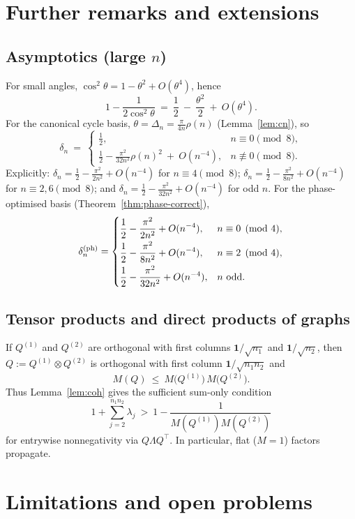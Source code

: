 \documentclass[12pt,fleqn]{amsart}
\renewcommand{\le}{\leqslant}
\theoremstyle{remark}
\newcommand{\1}{\mathbf{1}}
\newcommand{\Lam}{\Lambda}
\begin{document}
\section{Further remarks and extensions}

\subsection*{Asymptotics (large \texorpdfstring{$n$}{n})}
For small angles, $\cos^2\theta=1-\theta^2+O(\theta^4)$, hence
\[
1-\frac{1}{2\cos^2\theta}\ =\ \frac12\ -\ \frac{\theta^2}{2}\ +\ O(\theta^4).
\]
For the canonical cycle basis, $\theta=\Delta_n=\frac{\pi}{4n}\rho(n)$ (Lemma~\ref{lem:cn}), so
\[
\delta_n\ =\
\begin{cases}
\displaystyle \frac12, & n\equiv 0\pmod{8},\\[1mm]
\displaystyle \frac12 - \frac{\pi^2}{32n^2}\rho(n)^2\ +\ O(n^{-4}), & n\not\equiv 0\pmod{8}.
\end{cases}
\]
Explicitly: $\delta_n=\frac12-\frac{\pi^2}{2n^2}+O(n^{-4})$ for $n\equiv 4\pmod{8}$; $\delta_n=\frac12-\frac{\pi^2}{8n^2}+O(n^{-4})$ for $n\equiv 2,6\pmod{8}$; and $\delta_n=\frac12-\frac{\pi^2}{32n^2}+O(n^{-4})$ for odd $n$. For the phase-optimised basis (Theorem~\ref{thm:phase-correct}),
\[
\delta_n^{\rm (ph)}=
\begin{cases}
\displaystyle \frac12-\frac{\pi^2}{2n^2}+O(n^{-4}),   & n\equiv 0\pmod{4},\\[2mm]
\displaystyle \frac12-\frac{\pi^2}{8n^2}+O(n^{-4}),  & n\equiv 2\pmod{4},\\[2mm]
\displaystyle \frac12-\frac{\pi^2}{32n^2}+O(n^{-4}), & n\ \text{odd}.
\end{cases}
\]

\subsection*{Tensor products and direct products of graphs}
If $Q^{(1)}$ and $Q^{(2)}$ are orthogonal with first columns $\1/\sqrt{n_1}$ and $\1/\sqrt{n_2}$, then $Q:=Q^{(1)}\otimes Q^{(2)}$ is orthogonal with first column $\1/\sqrt{n_1n_2}$ and
\[
M(Q)\ \le\ M\!\big(Q^{(1)}\big)\,M\!\big(Q^{(2)}\big).
\]
Thus Lemma~\ref{lem:coh} gives the sufficient sum-only condition
\[
1+\sum_{j=2}^{n_1n_2}\lambda_j\ >\ 1-\frac{1}{M(Q^{(1)})M(Q^{(2)})}
\]
for entrywise nonnegativity via $Q\Lam Q^\top$. In particular, flat ($M=1$) factors propagate.

\section{Limitations and open problems}
\end{document}
